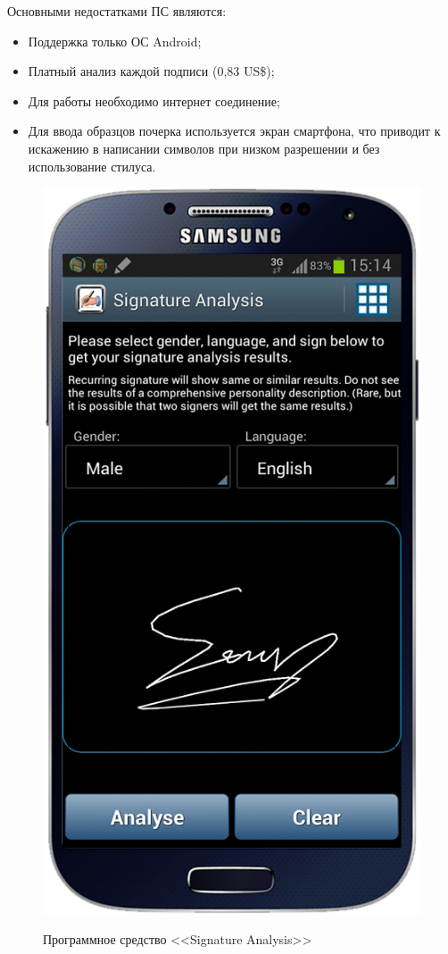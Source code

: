 Основными недостатками ПС являются:
\begin{itemize}
  \item Поддержка только ОС Android;
  \item Платный анализ каждой подписи (0,83 US\$);
  \item Для работы необходимо интернет соединение;
  \item Для ввода образцов почерка используется экран смартфона, что приводит к искажению в написании символов при низком разрешении и без использование стилуса.
\end{itemize}

\begin{figure}[ht]{}
    \centering
    \label{fig:domain:analogs:signature_analysis}
    \includegraphics[height=0.4\textheight]{figures/analog_signature_analysis.png}
    \caption{Программное средство <<Signature Analysis>>}
\end{figure}

